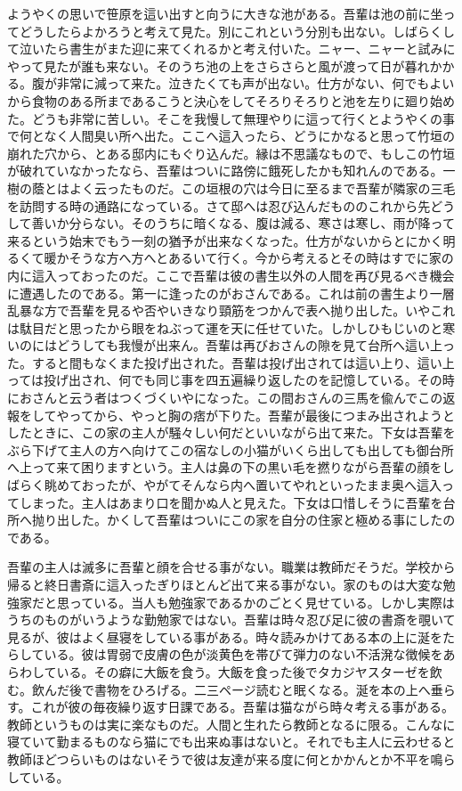 \documentclass[12pt, openright]{book}
\begin{document}
ようやくの思いで笹原を這い出すと向うに大きな池がある。吾輩は池の前に坐ってどうしたらよかろうと考えて見た。別にこれという分別も出ない。しばらくして泣いたら書生がまた迎に来てくれるかと考え付いた。ニャー、ニャーと試みにやって見たが誰も来ない。そのうち池の上をさらさらと風が渡って日が暮れかかる。腹が非常に減って来た。泣きたくても声が出ない。仕方がない、何でもよいから食物のある所まであるこうと決心をしてそろりそろりと池を左りに廻り始めた。どうも非常に苦しい。そこを我慢して無理やりに這って行くとようやくの事で何となく人間臭い所へ出た。ここへ這入ったら、どうにかなると思って竹垣の崩れた穴から、とある邸内にもぐり込んだ。縁は不思議なもので、もしこの竹垣が破れていなかったなら、吾輩はついに路傍に餓死したかも知れんのである。一樹の蔭とはよく云ったものだ。この垣根の穴は今日に至るまで吾輩が隣家の三毛を訪問する時の通路になっている。さて邸へは忍び込んだもののこれから先どうして善いか分らない。そのうちに暗くなる、腹は減る、寒さは寒し、雨が降って来るという始末でもう一刻の猶予が出来なくなった。仕方がないからとにかく明るくて暖かそうな方へ方へとあるいて行く。今から考えるとその時はすでに家の内に這入っておったのだ。ここで吾輩は彼の書生以外の人間を再び見るべき機会に遭遇したのである。第一に逢ったのがおさんである。これは前の書生より一層乱暴な方で吾輩を見るや否やいきなり頸筋をつかんで表へ抛り出した。いやこれは駄目だと思ったから眼をねぶって運を天に任せていた。しかしひもじいのと寒いのにはどうしても我慢が出来ん。吾輩は再びおさんの隙を見て台所へ這い上った。すると間もなくまた投げ出された。吾輩は投げ出されては這い上り、這い上っては投げ出され、何でも同じ事を四五遍繰り返したのを記憶している。その時におさんと云う者はつくづくいやになった。この間おさんの三馬を偸んでこの返報をしてやってから、やっと胸の痞が下りた。吾輩が最後につまみ出されようとしたときに、この家の主人が騒々しい何だといいながら出て来た。下女は吾輩をぶら下げて主人の方へ向けてこの宿なしの小猫がいくら出しても出しても御台所へ上って来て困りますという。主人は鼻の下の黒い毛を撚りながら吾輩の顔をしばらく眺めておったが、やがてそんなら内へ置いてやれといったまま奥へ這入ってしまった。主人はあまり口を聞かぬ人と見えた。下女は口惜しそうに吾輩を台所へ抛り出した。かくして吾輩はついにこの家を自分の住家と極める事にしたのである。

吾輩の主人は滅多に吾輩と顔を合せる事がない。職業は教師だそうだ。学校から帰ると終日書斎に這入ったぎりほとんど出て来る事がない。家のものは大変な勉強家だと思っている。当人も勉強家であるかのごとく見せている。しかし実際はうちのものがいうような勤勉家ではない。吾輩は時々忍び足に彼の書斎を覗いて見るが、彼はよく昼寝をしている事がある。時々読みかけてある本の上に涎をたらしている。彼は胃弱で皮膚の色が淡黄色を帯びて弾力のない不活溌な徴候をあらわしている。その癖に大飯を食う。大飯を食った後でタカジヤスターゼを飲む。飲んだ後で書物をひろげる。二三ページ読むと眠くなる。涎を本の上へ垂らす。これが彼の毎夜繰り返す日課である。吾輩は猫ながら時々考える事がある。教師というものは実に楽なものだ。人間と生れたら教師となるに限る。こんなに寝ていて勤まるものなら猫にでも出来ぬ事はないと。それでも主人に云わせると教師ほどつらいものはないそうで彼は友達が来る度に何とかかんとか不平を鳴らしている。
\end{document}
